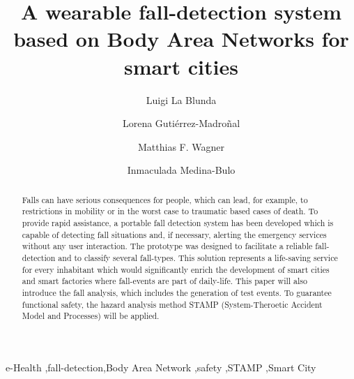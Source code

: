 \documentclass[review]{elsarticle}
\begin{document}
\begin{frontmatter}

\title{A wearable fall-detection system based on Body Area Networks for smart cities}

\author{Luigi La Blunda}
\author{Lorena Guti\'errez-Madro\~nal}
\author{Matthias F. Wagner}
\author{Inmaculada Medina-Bulo}
\address[label1]{WSN and IOT Research Group Frankfurt University of Applied Sciences, Nibelungenplatz 1, 60318 Frankfurt am Main, Germany}
\address[label2]{UCASE Software Engineering Research group, University of Cádiz, Av. Universidad de Cádiz, 10, 11519 Puerto Real, Spain}



%
%

\begin{abstract}
Falls can have serious consequences for people, which can lead, for example, to restrictions in mobility or in the worst case to traumatic based cases of death. To provide rapid assistance, a portable fall detection system has been developed which is capable of detecting fall situations and, if necessary, alerting the emergency services without any user interaction. The prototype was designed to facilitate a reliable fall-detection and to classify several fall-types. This solution represents a life-saving service for every inhabitant which would significantly enrich the development of smart cities and smart factories where fall-events are part of daily-life. This paper will also introduce the fall analysis, which includes the generation of test events. To guarantee functional safety, the hazard analysis method STAMP (System-Theroetic Accident Model and Processes) will be applied. 
\end{abstract}

\begin{keyword}
e-Health \sep fall-detection\sep Body Area Network \sep safety \sep STAMP \sep Smart City \ 
\end{keyword}

\end{frontmatter}
\end{document}
